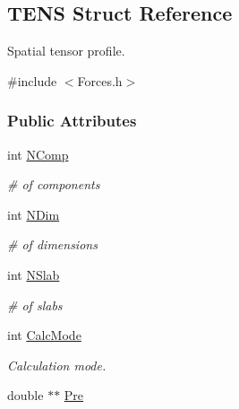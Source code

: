 \hypertarget{structTENS}{\subsection{\-T\-E\-N\-S \-Struct \-Reference}
\label{structTENS}
}


\-Spatial tensor profile.  




{\ttfamily \#include $<$\-Forces.\-h$>$}

\subsubsection*{\-Public \-Attributes}
\begin{DoxyCompactItemize}
\item 
\hypertarget{structTENS_a5a9396ca53c5306c34eb62ef4f02593b}{int \hyperlink{structTENS_a5a9396ca53c5306c34eb62ef4f02593b}{\-N\-Comp}}\label{structTENS_a5a9396ca53c5306c34eb62ef4f02593b}

\begin{DoxyCompactList}\small\item\em \# of components \end{DoxyCompactList}\item 
\hypertarget{structTENS_a3b5e7568c0a268ec8bbeef7f29ea111a}{int \hyperlink{structTENS_a3b5e7568c0a268ec8bbeef7f29ea111a}{\-N\-Dim}}\label{structTENS_a3b5e7568c0a268ec8bbeef7f29ea111a}

\begin{DoxyCompactList}\small\item\em \# of dimensions \end{DoxyCompactList}\item 
\hypertarget{structTENS_afa1c775c96b6e779b58ff0ff084d8cee}{int \hyperlink{structTENS_afa1c775c96b6e779b58ff0ff084d8cee}{\-N\-Slab}}\label{structTENS_afa1c775c96b6e779b58ff0ff084d8cee}

\begin{DoxyCompactList}\small\item\em \# of slabs \end{DoxyCompactList}\item 
\hypertarget{structTENS_ae7fd260630480928a069e7e536739df1}{int \hyperlink{structTENS_ae7fd260630480928a069e7e536739df1}{\-Calc\-Mode}}\label{structTENS_ae7fd260630480928a069e7e536739df1}

\begin{DoxyCompactList}\small\item\em \-Calculation mode. \end{DoxyCompactList}\item 
\hypertarget{structTENS_a3c45860d199670aae527e40339eb6437}{double $\ast$$\ast$ \hyperlink{structTENS_a3c45860d199670aae527e40339eb6437}{\-Pre}}\label{structTENS_a3c45860d199670aae527e40339eb6437}


\end{DoxyCompactItemize}
